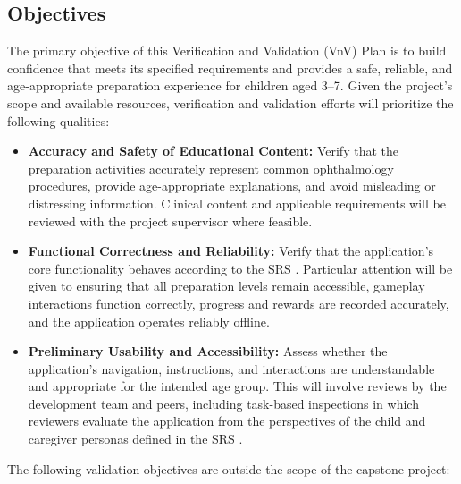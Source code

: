 \documentclass[10pt,titlepage]{article}
\begin{document}
\subsection{Objectives}

The primary objective of this Verification and Validation (VnV) Plan
is to build confidence that \progname{} meets its specified requirements
and provides a safe, reliable, and age-appropriate preparation
experience for children aged 3--7. Given the project's scope and
available resources, verification and validation efforts will
prioritize the following qualities:

\begin{itemize}
    \item \textbf{Accuracy and Safety of Educational Content:}
    Verify that the preparation activities accurately represent
    common ophthalmology procedures, provide age-appropriate
    explanations, and avoid misleading or distressing information.
    Clinical content and applicable requirements will be reviewed
    with the project supervisor where feasible.

    \item \textbf{Functional Correctness and Reliability:}
    Verify that the application's core functionality behaves
    according to the SRS \cite{SRS}. Particular attention will be given to
    ensuring that all preparation levels remain accessible,
    gameplay interactions function correctly, progress and
    rewards are recorded accurately, and the application operates
    reliably offline.

    \item \textbf{Preliminary Usability and Accessibility:}
    Assess whether the application's navigation, instructions,
    and interactions are understandable and appropriate for
    the intended age group. This will involve reviews by the
    development team and peers, including task-based inspections
    in which reviewers evaluate the application from the
    perspectives of the child and caregiver personas defined
    in the SRS \cite{SRS}.
\end{itemize}

The following validation objectives are outside the scope of the
capstone project:
\end{document}
